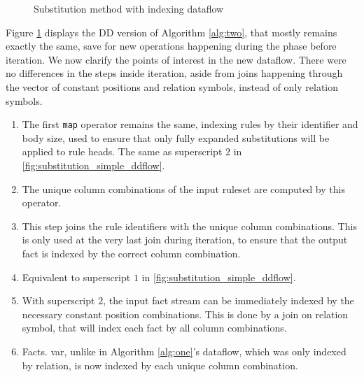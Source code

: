 \documentclass[sigconf,screen,review=false,natbib]{acmart}
\theoremstyle{definition}
\begin{document}
\begin{figure}
	\caption{Substitution method with indexing dataflow}
	\label{fig:substitution_indexed_ddflow}
\end{figure}
Figure \ref{fig:substitution_indexed_ddflow} displays the DD version of Algorithm \ref{alg:two}, that mostly remains exactly the same, save for new
operations happening during the phase before iteration. We now clarify the points of interest in the new dataflow. There were no differences in
the steps inside iteration, aside from joins happening through the vector of constant positions and relation symbols, instead of only relation symbols.
\begin{enumerate}
	\item The first \verb|map| operator remains the same, indexing rules by their identifier and body size, used to ensure
	      that only fully expanded substitutions will be applied to rule heads. The same as superscript $2$ in \ref{fig:substitution_simple_ddflow}.
	\item The unique column combinations of the input ruleset are computed by this operator.
	\item This step joins the rule identifiers with the unique column combinations. This is only used at the very last join during iteration, to ensure that
	      the output fact is indexed by the correct column combination.
	\item Equivalent to superscript $1$ in \ref{fig:substitution_simple_ddflow}.
	\item With superscript $2$, the input fact stream can be immediately indexed by the necessary constant position combinations. This is done by a join on
	      relation symbol, that will index each fact by all column combinations.
	\item Facts. var, unlike in Algorithm \ref{alg:one}'s dataflow, which was only indexed by relation, is now indexed by each unique column combination.
\end{enumerate}
\end{document}
